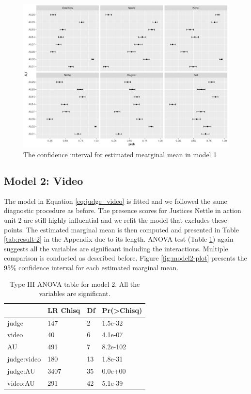 \documentclass{monashthesis}
\begin{document}
\begin{figure}

{\centering \includegraphics[width=1\linewidth]{figures/model1-plot-1} 

}

\caption{The confidence interval for estimated mearginal mean in model 1}\label{fig:model1-plot}
\end{figure}

\newpage

\hypertarget{model-2-video-1}{%
\subsection{Model 2: Video}\label{model-2-video-1}}

The model in Equation \ref{eq:judge_video} is fitted and we followed the same diagnostic procedure as before. The presence scores for Justices Nettle in action unit 2 are still highly influential and we refit the model that excludes these points. The estimated marginal mean is then computed and presented in Table \ref{tab:result-2} in the Appendix due to its length. ANOVA test (Table \ref{tab:anova-2}) again suggests all the variables are significant including the interactions. Multiple comparison is conducted as described before. Figure \ref{fig:model2-plot} presents the 95\% confidence interval for each estimated marginal mean.

\begin{table}

\caption{\label{tab:anova-2}\label{tab:anova-2}Type III ANOVA table for model 2. All the variables are significant.}
\centering
\begin{tabular}[t]{l|l|l|l}
\hline
  & LR Chisq & Df & Pr(>Chisq)\\
\hline
judge & 147 & 2 & 1.5e-32\\
\hline
video & 40 & 6 & 4.1e-07\\
\hline
AU & 491 & 7 & 8.2e-102\\
\hline
judge:video & 180 & 13 & 1.8e-31\\
\hline
judge:AU & 3407 & 35 & 0.0e+00\\
\hline
video:AU & 291 & 42 & 5.1e-39\\
\hline
\end{tabular}
\end{table}
\end{document}
